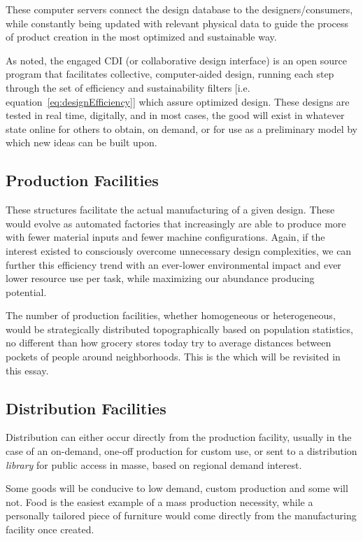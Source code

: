 \documentclass[10pt, a4paper, cleardoubleempty, openright, twoside]{book}
\begin{document}
These computer servers connect the design database to the
designers/consumers, while constantly being updated with relevant
physical data to guide the process of product creation in the most
optimized and sustainable way. 

As noted, the engaged CDI (or collaborative design interface) is an open
source program that facilitates collective, computer-aided design,
running each step through the set of efficiency and sustainability
filters [i.e. equation~\eqref{eq:designEfficiency}] which assure
optimized design. These designs are tested in real time, digitally, and
in most cases, the good will exist in whatever state online for others
to obtain, on demand, or for use as a preliminary model by which new
ideas can be built upon. 


\subsection {Production Facilities}

These structures facilitate the actual manufacturing of a given design.
These would evolve as automated factories that increasingly are able to
produce more with fewer material inputs and fewer machine
configurations. Again, if the interest existed to consciously overcome
unnecessary design complexities, we can further this efficiency trend
with an ever-lower environmental impact and ever lower resource use per
task, while maximizing our abundance producing potential. 

The number of production facilities, whether homogeneous or
heterogeneous, would be strategically distributed topographically based
on population statistics, no different than how grocery stores today try
to average distances between pockets of people around neighborhoods.
This is the  which will be revisited in
this essay. 


\subsection {Distribution Facilities}

Distribution can either occur directly from the production facility,
usually in the case of an on-demand, one-off production for custom use,
or sent to a distribution \emph{library} for public access in masse,
based on regional demand interest. 

Some goods will be conducive to low demand, custom production and some
will not. Food is the easiest example of a mass production necessity,
while a personally tailored piece of furniture would come directly from
the manufacturing facility once created. 
\end{document}

